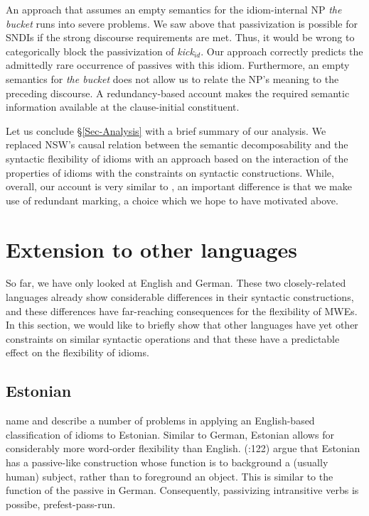 \documentclass[output=paper]{langsci/langscibook}
\begin{document}
An approach that assumes an empty semantics for the idiom-internal NP \textit{the bucket} runs into severe problems. We saw above that passivization is possible for SNDIs 
if the strong discourse requirements are met. 
Thus, %
it would be wrong to categorically block the passivization of
\textit{kick$_{id}$}.
Our approach correctly predicts the admittedly rare occurrence of passives with this idiom.
%
Furthermore, an empty semantics for \textit{the bucket} does not allow us to relate the NP's meaning to the preceding discourse. A redundancy-based account makes the required semantic information available at the clause-initial constituent.

Let us conclude §\ref{Sec-Analysis} with a brief summary of our analysis. We replaced NSW's causal relation  between the semantic decomposability and the  syntactic flexibility of idioms with an approach based on  the interaction of the properties of idioms with the constraints on syntactic constructions. While, overall, our account is very similar to \cite{kaysagidioms}, an important difference is that we make use of redundant marking, a choice which we hope to have motivated above.



\section{Extension to other languages}
\label{Sec-OtherLanguages}

So far, we have only looked at 
English and German. These two closely-related languages already show considerable differences in their syntactic constructions, and these differences have far-reaching consequences for the flexibility of MWEs. In this section, we would like to briefly show that other languages have yet other constraints on similar syntactic operations and that these have a predictable effect on the flexibility of idioms.



\subsection{Estonian}

\cite{Muischnek:Kaalep:10} name and describe a number of problems in applying an English-based classification of idioms to Estonian. Similar to German, Estonian allows for considerably more word-order flexibility than English. \citeauthor{Muischnek:Kaalep:10} (\citeyear{Muischnek:Kaalep:10}:122) argue that Estonian has a  passive-like construction whose function is to background a (usually human) subject, rather than to foreground an object. This is similar to the function of the passive in German. Consequently, passivizing intransitive verbs is possibe, pref{est-pass-run}.
\end{document}
